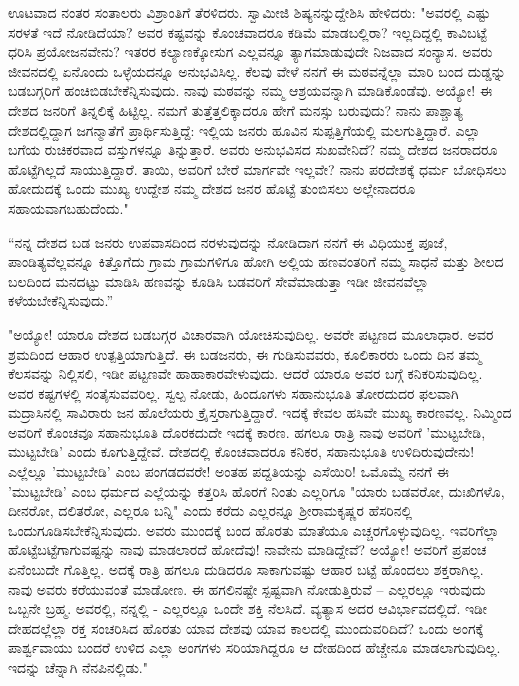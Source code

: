 ಊಟವಾದ ನಂತರ ಸಂತಾಲರು ವಿಶ್ರಾಂತಿಗೆ ತೆರಳಿದರು. ಸ್ವಾಮೀಜಿ ಶಿಷ್ಯನನ್ನುದ್ದೇಶಿಸಿ ಹೇಳಿದರು: "ಅವರಲ್ಲಿ ಎಷ್ಟು ಸರಳತೆ ಇದೆ ನೋಡಿದೆಯಾ? ಅವರ ಕಷ್ಟವನ್ನು ಕೊಂಚವಾದರೂ ಕಡಿಮೆ ಮಾಡಬಲ್ಲಿರಾ? ಇಲ್ಲದಿದ್ದಲ್ಲಿ ಕಾವಿಬಟ್ಟೆ ಧರಿಸಿ ಪ್ರಯೋಜನವೇನು? ಇತರರ ಕಲ್ಯಾಣಕ್ಕೋಸುಗ ಎಲ್ಲವನ್ನೂ ತ್ಯಾಗಮಾಡುವುದೇ ನಿಜವಾದ ಸಂನ್ಯಾಸ. ಅವರು ಜೀವನದಲ್ಲಿ ಏನೊಂದು ಒಳ್ಳೆಯದನ್ನೂ ಅನುಭವಿಸಿಲ್ಲ. ಕೆಲವು ವೇಳೆ ನನಗೆ ಈ ಮಠವನ್ನೆಲ್ಲಾ ಮಾರಿ ಬಂದ ದುಡ್ಡನ್ನು ಬಡಬಗ್ಗರಿಗೆ ಹಂಚಿಬಿಡಬೇಕೆನ್ನಿಸುವುದು. ನಾವು ಮಠವನ್ನು ನಮ್ಮ ಆಶ್ರಯವನ್ನಾಗಿ ಮಾಡಿಕೊಂಡೆವು. ಅಯ್ಯೋ! ಈ ದೇಶದ ಜನರಿಗೆ ತಿನ್ನಲಿಕ್ಕೆ ಹಿಟ್ಟಿಲ್ಲ. ನಮಗೆ ತುತ್ತೆತ್ತಲಿಕ್ಕಾದರೂ ಹೇಗೆ ಮನಸ್ಸು ಬರುವುದು? ನಾನು ಪಾಶ್ಚಾತ್ಯ ದೇಶದಲ್ಲಿದ್ದಾಗ ಜಗನ್ಮಾತೆಗೆ ಪ್ರಾರ್ಥಿಸುತ್ತಿದ್ದೆ: ಇಲ್ಲಿಯ ಜನರು ಹೂವಿನ ಸುಪ್ಪತ್ತಿಗೆಯಲ್ಲಿ ಮಲಗುತ್ತಿದ್ದಾರೆ. ಎಲ್ಲಾ ಬಗೆಯ ರುಚಿಕರವಾದ ವಸ್ತುಗಳನ್ನೂ ತಿನ್ನುತ್ತಾರೆ. ಅವರು ಅನುಭವಿಸದ ಸುಖವೇನಿದೆ? ನಮ್ಮ ದೇಶದ ಜನರಾದರೂ ಹೊಟ್ಟೆಗಿಲ್ಲದೆ ಸಾಯುತ್ತಿದ್ದಾರೆ. ತಾಯಿ, ಅವರಿಗೆ ಬೇರೆ ಮಾರ್ಗವೇ ಇಲ್ಲವೇ? ನಾನು ಪರದೇಶಕ್ಕೆ ಧರ್ಮ ಬೋಧಿಸಲು ಹೋದುದಕ್ಕೆ ಒಂದು ಮುಖ್ಯ ಉದ್ದೇಶ ನಮ್ಮ ದೇಶದ ಜನರ ಹೊಟ್ಟೆ ತುಂಬಿಸಲು ಅಲ್ಲೇನಾದರೂ ಸಹಾಯವಾಗಬಹುದೆಂದು."

“ನನ್ನ ದೇಶದ ಬಡ ಜನರು ಉಪವಾಸದಿಂದ ನರಳುವುದನ್ನು ನೋಡಿದಾಗ ನನಗೆ ಈ ವಿಧಿಯುಕ್ತ ಪೂಜೆ, ಪಾಂಡಿತ್ಯವೆಲ್ಲವನ್ನೂ ಕಿತ್ತೊಗೆದು ಗ್ರಾಮ ಗ್ರಾಮಗಳಿಗೂ ಹೋಗಿ ಅಲ್ಲಿಯ ಹಣವಂತರಿಗೆ ನಮ್ಮ ಸಾಧನೆ ಮತ್ತು ಶೀಲದ ಬಲದಿಂದ ಮನದಟ್ಟು ಮಾಡಿಸಿ ಹಣವನ್ನು ಕೂಡಿಸಿ ಬಡವರಿಗೆ ಸೇವೆಮಾಡುತ್ತಾ ಇಡೀ ಜೀವನವೆಲ್ಲಾ ಕಳೆಯಬೇಕೆನ್ನಿಸುವುದು.”

"ಅಯ್ಯೋ! ಯಾರೂ ದೇಶದ ಬಡಬಗ್ಗರ ವಿಚಾರವಾಗಿ ಯೋಚಿಸುವುದಿಲ್ಲ. ಅವರೇ ಪಟ್ಟಣದ ಮೂಲಾಧಾರ. ಅವರ ಶ್ರಮದಿಂದ ಆಹಾರ ಉತ್ಪತ್ತಿಯಾಗುತ್ತಿದೆ. ಈ ಬಡಜನರು, ಈ ಗುಡಿಸುವವರು, ಕೂಲಿಕಾರರು ಒಂದು ದಿನ ತಮ್ಮ ಕೆಲಸವನ್ನು ನಿಲ್ಲಿಸಲಿ, ಇಡೀ ಪಟ್ಟಣವೇ ಹಾಹಾಕಾರವೇಳುವುದು. ಆದರೆ ಯಾರೂ ಅವರ ಬಗ್ಗೆ ಕನಿಕರಿಸುವುದಿಲ್ಲ. ಅವರ ಕಷ್ಟಗಳಲ್ಲಿ ಸಂತೈಸುವವರಿಲ್ಲ. ಸ್ವಲ್ಪ ನೋಡು, ಹಿಂದೂಗಳು ಸಹಾನುಭೂತಿ ತೋರದುದರ ಫಲವಾಗಿ ಮದ್ರಾಸಿನಲ್ಲಿ ಸಾವಿರಾರು ಜನ ಹೊಲೆಯರು ಕ್ರೈಸ್ತರಾಗುತ್ತಿದ್ದಾರೆ. ಇದಕ್ಕೆ ಕೇವಲ ಹಸಿವೇ ಮುಖ್ಯ ಕಾರಣವಲ್ಲ. ನಿಮ್ಮಿಂದ ಅವರಿಗೆ ಕೊಂಚವೂ ಸಹಾನುಭೂತಿ ದೊರಕದುದೇ ಇದಕ್ಕೆ ಕಾರಣ. ಹಗಲೂ ರಾತ್ರಿ ನಾವು ಅವರಿಗೆ 'ಮುಟ್ಟಬೇಡಿ, ಮುಟ್ಟಬೇಡಿ' ಎಂದು ಕೂಗುತ್ತಿದ್ದೇವೆ. ದೇಶದಲ್ಲಿ ಕೊಂಚವಾದರೂ ಕನಿಕರ, ಸಹಾನುಭೂತಿ ಉಳಿದಿರುವುದೇನು! ಎಲ್ಲೆಲ್ಲೂ 'ಮುಟ್ಟಬೇಡಿ' ಎಂಬ ಪಂಗಡದವರೇ! ಅಂತಹ ಪದ್ದತಿಯನ್ನು ಎಸೆಯಿರಿ! ಒಮೊಮ್ಮೆ ನನಗೆ ಈ 'ಮುಟ್ಟಬೇಡಿ' ಎಂಬ ಧರ್ಮದ ಎಲ್ಲೆಯನ್ನು ಕತ್ತರಿಸಿ ಹೊರಗೆ ನಿಂತು ಎಲ್ಲರಿಗೂ "ಯಾರು ಬಡವರೋ, ದುಃಖಿಗಳೊ, ದೀನರೋ, ದಲಿತರೋ, ಎಲ್ಲರೂ ಬನ್ನಿ" ಎಂದು ಕರೆದು ಎಲ್ಲರನ್ನೂ ಶ‍್ರೀರಾಮಕೃಷ್ಣರ ಹೆಸರಿನಲ್ಲಿ ಒಂದುಗೂಡಿಸಬೇಕೆನ್ನಿಸುವುದು. ಅವರು ಮುಂದಕ್ಕೆ ಬಂದ ಹೊರತು ಮಾತೆಯೂ ಎಚ್ಚರಗೊಳ್ಳುವುದಿಲ್ಲ. ಇವರಿಗೆಲ್ಲಾ ಹೊಟ್ಟೆಬಟ್ಟೆಗಾಗುವಷ್ಟನ್ನು ನಾವು ಮಾಡಲಾರದೆ ಹೋದೆವು! ನಾವೇನು ಮಾಡಿದ್ದೇವೆ? ಅಯ್ಯೋ! ಅವರಿಗೆ ಪ್ರಪಂಚ ಏನೆಂಬುದೇ ಗೊತ್ತಿಲ್ಲ. ಅದಕ್ಕೆ ರಾತ್ರಿ ಹಗಲೂ ದುಡಿದರೂ ಸಾಕಾಗುವಷ್ಟು ಆಹಾರ ಬಟ್ಟೆ ಹೊಂದಲು ಶಕ್ತರಾಗಿಲ್ಲ. ನಾವು ಅವರು ಕರೆಯುವಂತೆ ಮಾಡೋಣ. ಈ ಹಗಲಿನಷ್ಟೇ ಸ್ಪಷ್ಟವಾಗಿ ನೋಡುತ್ತಿರುವೆ – ಎಲ್ಲರಲ್ಲೂ ಇರುವುದು ಒಬ್ಬನೇ ಬ್ರಹ್ಮ. ಅವರಲ್ಲಿ, ನನ್ನಲ್ಲಿ - ಎಲ್ಲರಲ್ಲೂ ಒಂದೇ ಶಕ್ತಿ ನೆಲಸಿದೆ. ವ್ಯತ್ಯಾಸ ಅದರ ಆವಿರ್ಭಾವದಲ್ಲಿದೆ. ಇಡೀ ದೇಹದಲ್ಲೆಲ್ಲಾ ರಕ್ತ ಸಂಚರಿಸಿದ ಹೊರತು ಯಾವ ದೇಶವು ಯಾವ ಕಾಲದಲ್ಲಿ ಮುಂದುವರಿದಿದೆ? ಒಂದು ಅಂಗಕ್ಕೆ ಪಾರ್ಶ್ವವಾಯು ಬಂದರೆ ಉಳಿದ ಎಲ್ಲಾ ಅಂಗಗಳು ಸರಿಯಾಗಿದ್ದರೂ ಆ ದೇಹದಿಂದ ಹೆಚ್ಚೇನೂ ಮಾಡಲಾಗುವುದಿಲ್ಲ. ಇದನ್ನು ಚೆನ್ನಾಗಿ ನೆನಪಿನಲ್ಲಿಡು."

